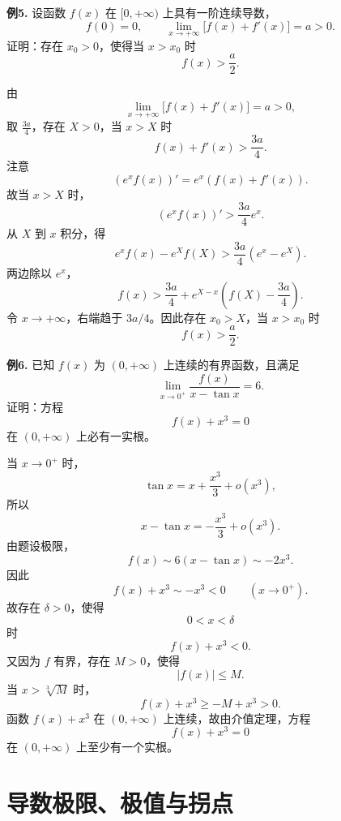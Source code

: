 \begin{problemblock}
\textbf{例5.} 设函数 \(f(x)\) 在 \([0,+\infty)\) 上具有一阶连续导数，
\[
f(0)=0,\qquad \lim_{x\to+\infty}\bigl[f(x)+f'(x)\bigr]=a>0.
\]
证明：存在 \(x_0>0\)，使得当 \(x>x_0\) 时
\[
f(x)>\frac a2.
\]
\end{problemblock}
\begin{solutionblock}
由
\[
\lim_{x\to+\infty}\bigl[f(x)+f'(x)\bigr]=a>0,
\]
取 \(\frac{3a}{4}\)，存在 \(X>0\)，当 \(x>X\) 时
\[
f(x)+f'(x)>\frac{3a}{4}.
\]
注意
\[
(e^xf(x))'=e^x(f(x)+f'(x)).
\]
故当 \(x>X\) 时，
\[
(e^xf(x))'>\frac{3a}{4}e^x.
\]
从 \(X\) 到 \(x\) 积分，得
\[
e^xf(x)-e^Xf(X)
>\frac{3a}{4}(e^x-e^X).
\]
两边除以 \(e^x\)，
\[
f(x)>\frac{3a}{4}
+e^{X-x}\left(f(X)-\frac{3a}{4}\right).
\]
令 \(x\to+\infty\)，右端趋于 \(3a/4\)。因此存在 \(x_0>X\)，当 \(x>x_0\) 时
\[
f(x)>\frac a2.
\]
\end{solutionblock}

\begin{problemblock}
\textbf{例6.} 已知 \(f(x)\) 为 \((0,+\infty)\) 上连续的有界函数，且满足
\[
\lim_{x\to0^+}\frac{f(x)}{x-\tan x}=6.
\]
证明：方程
\[
f(x)+x^3=0
\]
在 \((0,+\infty)\) 上必有一实根。
\end{problemblock}
\begin{solutionblock}
当 \(x\to0^+\) 时，
\[
\tan x=x+\frac{x^3}{3}+o(x^3),
\]
所以
\[
x-\tan x=-\frac{x^3}{3}+o(x^3).
\]
由题设极限，
\[
f(x)\sim 6(x-\tan x)\sim -2x^3.
\]
因此
\[
f(x)+x^3\sim -x^3<0\qquad (x\to0^+).
\]
故存在 \(\delta>0\)，使得
\[
0<x<\delta
\]
时
\[
f(x)+x^3<0.
\]
又因为 \(f\) 有界，存在 \(M>0\)，使得
\[
|f(x)|\le M.
\]
当 \(x>\sqrt[3]{M}\) 时，
\[
f(x)+x^3\ge -M+x^3>0.
\]
函数 \(f(x)+x^3\) 在 \((0,+\infty)\) 上连续，故由介值定理，方程
\[
f(x)+x^3=0
\]
在 \((0,+\infty)\) 上至少有一个实根。
\end{solutionblock}

\section{导数极限、极值与拐点}

